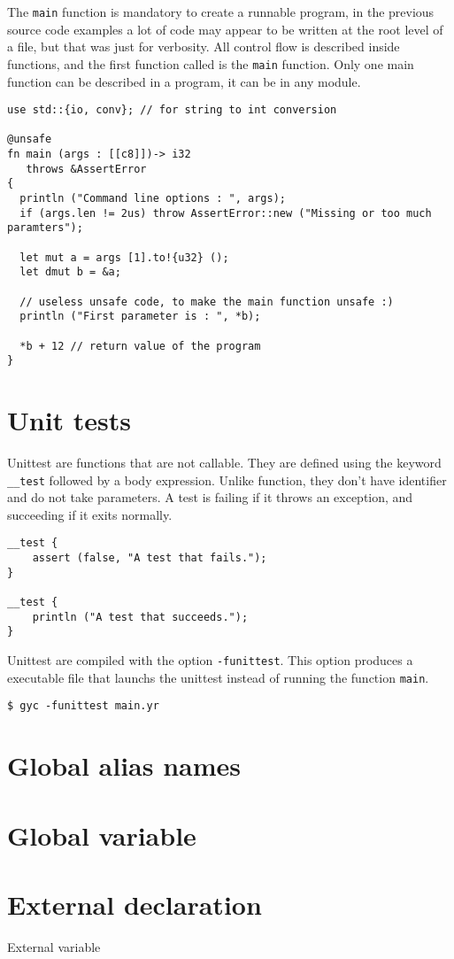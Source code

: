 The \texttt{main} function is mandatory to create a runnable program, in the
previous source code examples a lot of code may appear to be written at the root
level of a file, but that was just for verbosity. All control flow is described
inside functions, and the first function called is the \texttt{main} function.
Only one main function can be described in a program, it can be in any module.


\begin{lstlisting}[style=coloredverbatim, caption=The most complex main function]
use std::{io, conv}; // for string to int conversion

@unsafe
fn main (args : [[c8]])-> i32
   throws &AssertError
{
  println ("Command line options : ", args);
  if (args.len != 2us) throw AssertError::new ("Missing or too much paramters");

  let mut a = args [1].to!{u32} ();
  let dmut b = &a;

  // useless unsafe code, to make the main function unsafe :)
  println ("First parameter is : ", *b);

  *b + 12 // return value of the program
}
\end{lstlisting}

\section{Unit tests}%
\label{sec:unit_test}

Unittest are functions that are not callable. They are defined using the keyword
\texttt{\_\_test} followed by a body expression. Unlike function, they don't
have identifier and do not take parameters. A test is failing if it throws an
exception, and succeeding if it exits normally.

\begin{lstlisting}[style=coloredverbatim]
__test {
    assert (false, "A test that fails.");
}

__test {
    println ("A test that succeeds.");
}
\end{lstlisting}


Unittest are compiled with the option \texttt{-funittest}. This option produces
a executable file that launchs the unittest instead of running the function
\texttt{main}.

\begin{lstlisting}[color=intermediateVerb]
$ gyc -funittest main.yr

\end{lstlisting}


\section{Global alias names}
\label{sec:global_alias_names}


\section{Global variable}%
\label{sec:global_variables}

\section{External declaration}%
\label{sec:extern_var}

External variable
